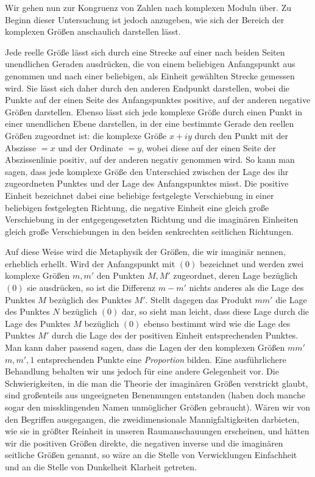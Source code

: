 Wir gehen nun zur Kongruenz von Zahlen nach komplexen Moduln über. Zu Beginn dieser Untersuchung ist jedoch anzugeben, wie sich der Bereich der komplexen Größen anschaulich darstellen lässt.

Jede reelle Größe lässt sich durch eine Strecke auf einer nach beiden Seiten unendlichen Geraden ausdrücken, die von einem beliebigen Anfangspunkt aus genommen und nach einer beliebigen, als Einheit gewählten Strecke gemessen wird. Sie lässt sich daher durch den anderen Endpunkt darstellen, wobei die Punkte auf der einen Seite des Anfangspunktes positive, auf der anderen negative Größen darstellen. Ebenso lässt sich jede komplexe Größe durch einen Punkt in einer unendlichen Ebene darstellen, in der eine bestimmte Gerade den reellen Größen zugeordnet ist: die komplexe Größe $x+iy$ durch den Punkt mit der Abszisse $=x$ und der Ordinate $=y$, wobei diese auf der einen Seite der Abszissenlinie positiv, auf der anderen negativ genommen wird. So kann man sagen, dass jede komplexe Größe den Unterschied zwischen der Lage des ihr zugeordneten Punktes und der Lage des Anfangspunktes misst. Die positive Einheit bezeichnet dabei eine beliebige festgelegte Verschiebung in einer beliebigen festgelegten Richtung, die negative Einheit eine gleich große Verschiebung in der entgegengesetzten Richtung und die imaginären Einheiten gleich große Verschiebungen in den beiden senkrechten seitlichen Richtungen.

Auf diese Weise wird die Metaphysik der Größen, die wir imaginär nennen, erheblich erhellt. Wird der Anfangspunkt mit $(0)$ bezeichnet und werden zwei komplexe Größen $m,m'$ den Punkten $M,M'$ zugeordnet, deren Lage bezüglich $(0)$ sie ausdrücken, so ist die Differenz $m-m'$ nichts anderes als die Lage des Punktes $M$ bezüglich des Punktes $M'$. Stellt dagegen das Produkt $mm'$ die Lage des Punktes $N$ bezüglich $(0)$ dar, so sieht man leicht, dass diese Lage durch die Lage des Punktes $M$ bezüglich $(0)$ ebenso bestimmt wird wie die Lage des Punktes $M'$ durch die Lage des der positiven Einheit entsprechenden Punktes. Man kann daher passend sagen, dass die Lagen der den komplexen Größen $mm'$
%
$m,m',1$ entsprechenden Punkte eine \emph{Proportion} bilden. Eine ausführlichere Behandlung behalten wir uns jedoch für eine andere Gelegenheit vor. Die Schwierigkeiten, in die man die Theorie der imaginären Größen verstrickt glaubt, sind großenteils aus ungeeigneten Benennungen entstanden (haben doch manche sogar den missklingenden Namen unmöglicher Größen gebraucht). Wären wir von den Begriffen ausgegangen, die zweidimensionale Mannigfaltigkeiten darbieten, wie sie in größter Reinheit in unseren Raumanschauungen erscheinen, und hätten wir die positiven Größen direkte, die negativen inverse und die imaginären seitliche Größen genannt, so wäre an die Stelle von Verwicklungen Einfachheit und an die Stelle von Dunkelheit Klarheit getreten.

